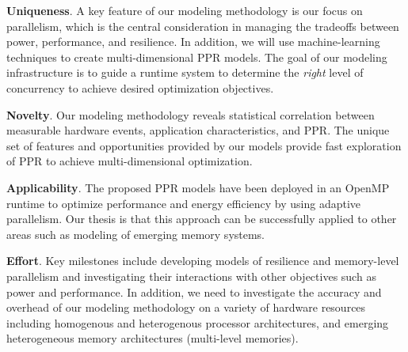 \documentclass{article}  %
\begin{document}
\noindent\textbf{Uniqueness}.
A key feature of our modeling methodology is our focus on
parallelism, which is the central consideration in managing the tradeoffs
between power, performance, and resilience. In addition, we will use
machine-learning techniques to create multi-dimensional PPR models.
The goal of our modeling infrastructure is to guide a runtime system 
to determine the \emph{right} level of concurrency to achieve desired 
optimization objectives. 


\noindent\textbf{Novelty}. 
Our modeling methodology reveals statistical correlation
between measurable hardware events, application characteristics, and 
PPR. The unique set of features and opportunities provided by our models
provide fast exploration of PPR to achieve multi-dimensional optimization.     

\noindent\textbf{Applicability}. 
The proposed PPR models have been deployed in an OpenMP runtime to
optimize performance and energy efficiency by using adaptive
parallelism. Our thesis is that this approach can be successfully applied
to other areas such as modeling of emerging memory systems. 


\noindent\textbf{Effort}. 
Key milestones include developing models of resilience and memory-level 
parallelism and investigating their interactions with other 
objectives such as power and performance. In addition, we need to
investigate the accuracy and overhead of our modeling methodology on a
variety of hardware  resources including homogenous and heterogenous
processor architectures, and emerging heterogeneous memory architectures
(multi-level memories). 




\end{document}
